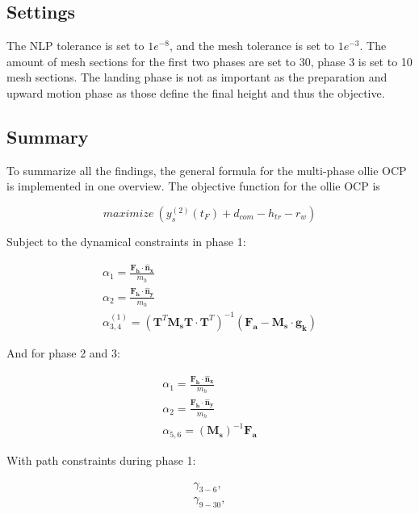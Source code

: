 \documentclass[default,iicol]{sn-jnl}
\begin{document}
\subsection{Settings}\label{s_settings}
The NLP tolerance is set to $1e^{-8}$, and the mesh tolerance is set to $1e^{-3}$. The amount of mesh sections for the first two phases are set to 30, phase 3 is set to 10 mesh sections. The landing phase is not as important as the preparation and upward motion phase as those define the final height and thus the objective.

\subsection{Summary}\label{s_summary}
To summarize all the findings, the general formula for the multi-phase ollie OCP is implemented in one overview. The objective function for the ollie OCP is 

\begin{equation}
     maximize\ (y_s^{(2)}(t_F) + d_{com} - h_{tr} - r_w)
\end{equation} 

Subject to the dynamical constraints in phase 1:

\begin{equation}
\begin{array}{c}
        \alpha_{1} = \frac{\mathbf{F_h}\cdot \mathbf{\hat n_x}}{m_h}\\
        \alpha_{2} = \frac{\mathbf{F_h}\cdot \mathbf{\hat n_y}}{m_h}\\
        \alpha_{3,4}^{(1)} =   \left(\mathbf{T}^T \mathbf{M_s} \mathbf{T} \cdot  \mathbf{T}^T\right)^{-1} (\mathbf{F_a} - \mathbf{M_s} \cdot \mathbf{g_k})
\end{array}
\end{equation}

And for phase 2 and 3:

\begin{equation}
    \begin{array}{c}
        \alpha_{1} = \frac{\mathbf{F_h}\cdot \mathbf{\hat n_x}}{m_h}\\
        \alpha_{2} = \frac{\mathbf{F_h}\cdot \mathbf{\hat n_y}}{m_h}\\ 
        \alpha_{5,6} = (\mathbf{M_s})^{-1}\mathbf{F_a}
    \end{array}
\end{equation}

With path constraints during phase 1:

\begin{equation}
    \begin{array}{c}
         \gamma_{3-6},  \\
         \gamma_{9-30},
    \end{array}
\end{equation}
\end{document}
